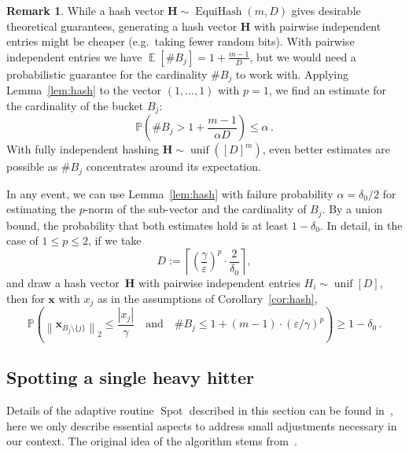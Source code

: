 \documentclass[12pt]{article}
\theoremstyle{plain}
\theoremstyle{definition}
\newtheorem{remark}[theorem]{Remark}
\renewcommand{\P}{{\mathbb P}}
\newcommand{\expect}{\operatorname{\mathbb{E}}}
\DeclareMathOperator{\Uniform}{unif}
\DeclareMathOperator{\EquiHash}{EquiHash}
\newcommand{\eps}{\varepsilon}
\renewcommand{\vec}{\boldsymbol}
\DeclareMathOperator{\spot}{Spot}
\begin{document}
\begin{remark}
    While a hash vector $\vec{H} \sim \EquiHash(m,D)$ gives desirable theoretical guarantees,
    generating a hash vector $\vec{H}$ with pairwise independent entries might be cheaper
    (e.g.\ taking fewer random bits).
    With pairwise independent entries we have $\expect [\#B_j] = 1 + \frac{m-1}{D}$,
    but we would need a probabilistic guarantee for the cardinality $\#B_j$ to work with.
    Applying Lemma~\ref{lem:hash} to the vector $(1,\ldots,1)$ with $p=1$, we find an estimate for the cardinality of the bucket $B_j$:
    \begin{equation*}
        \P\left( \# B_j > 1 + \frac{m-1}{\alpha D} \right) \leq \alpha \,.
    \end{equation*}
    With fully independent hashing $\vec{H} \sim \Uniform([D]^m)$, even better estimates are possible as $\#B_j$ concentrates around its expectation.
    
    In any event, we can use Lemma~\ref{lem:hash} with failure probability $\alpha = \delta_0/2$
    for estimating the $p$-norm of the sub-vector and the cardinality of $B_j$.
    By a union bound, the probability that both estimates hold is at least $1-\delta_0$.
    In detail, in the case of $1 \leq p \leq 2$, if we take
    \begin{equation*}
        D := \left\lceil \left(\frac{\gamma}{\eps}\right)^p \cdot \frac{2}{\delta_0} \right\rceil ,
    \end{equation*}
    and draw a hash vector~$\vec{H}$ with pairwise independent entries $H_i \sim \Uniform[D]$, then
    for $\vec{x}$ with $x_j$ as in the assumptions of Corollary~\ref{cor:hash},
    \begin{equation*}
        \P\left(\left\|\vec{x}_{B_j\setminus\{j\}}\right\|_2 \leq \frac{|x_j|}{\gamma}
            \quad\text{and}\quad \#B_j \leq 1 + (m-1) \cdot \left(\eps/\gamma\right)^p\right)
            \geq 1 - \delta_0 \,.
    \end{equation*}
\end{remark}

\subsection{Spotting a single heavy hitter}
\label{sec:spot}

Details of the adaptive routine $\spot$ described in this section can be found in~\cite[Sec~2.3]{KW24b},
here we only describe essential aspects to address small adjustments necessary in our context.
The original idea of the algorithm stems from~\cite[Sec~3.1]{IPW11}.
\end{document}
